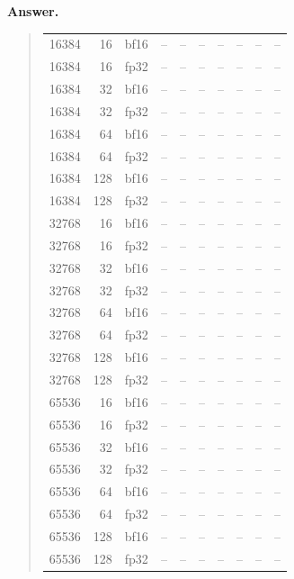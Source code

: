 \documentclass[11pt]{article}
\newenvironment{answer}{%
  \vspace{0.3em}%
  \noindent\textbf{Answer.}\begin{quote}%
}{%
  \end{quote}\vspace{0.4em}%
}
\begin{document}
\begin{answer}
\begin{table}[H]
{\begin{tabular}{@{}rrlrrrrrrr@{}}
    16384 & 16 & bf16 & -- & -- & -- & -- & -- & -- & -- \\
    16384 & 16 & fp32 & -- & -- & -- & -- & -- & -- & -- \\
    16384 & 32 & bf16 & -- & -- & -- & -- & -- & -- & -- \\
    16384 & 32 & fp32 & -- & -- & -- & -- & -- & -- & -- \\
    16384 & 64 & bf16 & -- & -- & -- & -- & -- & -- & -- \\
    16384 & 64 & fp32 & -- & -- & -- & -- & -- & -- & -- \\
    16384 & 128 & bf16 & -- & -- & -- & -- & -- & -- & -- \\
    16384 & 128 & fp32 & -- & -- & -- & -- & -- & -- & -- \\
    32768 & 16 & bf16 & -- & -- & -- & -- & -- & -- & -- \\
    32768 & 16 & fp32 & -- & -- & -- & -- & -- & -- & -- \\
    32768 & 32 & bf16 & -- & -- & -- & -- & -- & -- & -- \\
    32768 & 32 & fp32 & -- & -- & -- & -- & -- & -- & -- \\
    32768 & 64 & bf16 & -- & -- & -- & -- & -- & -- & -- \\
    32768 & 64 & fp32 & -- & -- & -- & -- & -- & -- & -- \\
    32768 & 128 & bf16 & -- & -- & -- & -- & -- & -- & -- \\
    32768 & 128 & fp32 & -- & -- & -- & -- & -- & -- & -- \\
    65536 & 16 & bf16 & -- & -- & -- & -- & -- & -- & -- \\
    65536 & 16 & fp32 & -- & -- & -- & -- & -- & -- & -- \\
    65536 & 32 & bf16 & -- & -- & -- & -- & -- & -- & -- \\
    65536 & 32 & fp32 & -- & -- & -- & -- & -- & -- & -- \\
    65536 & 64 & bf16 & -- & -- & -- & -- & -- & -- & -- \\
    65536 & 64 & fp32 & -- & -- & -- & -- & -- & -- & -- \\
    65536 & 128 & bf16 & -- & -- & -- & -- & -- & -- & -- \\
    65536 & 128 & fp32 & -- & -- & -- & -- & -- & -- & -- \\
    \bottomrule
    \end{tabular}
    }
    \end{table}    
\end{answer}
\end{document}
